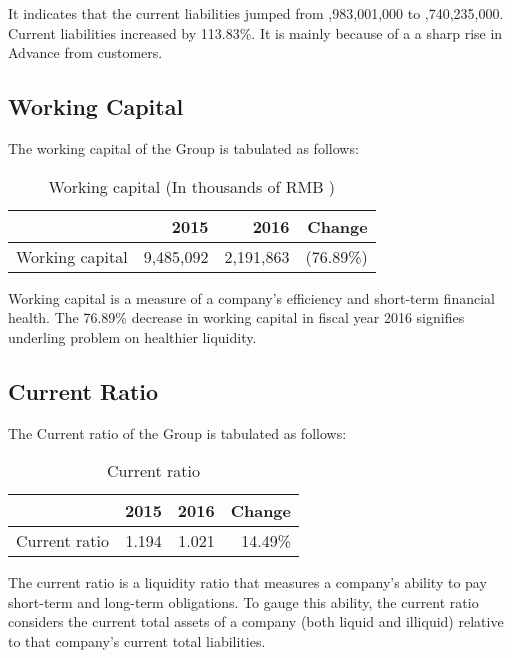 It indicates that the current liabilities jumped from ,983,001,000 to ,740,235,000. Current liabilities increased by 113.83\%. It is mainly because of a a sharp rise in Advance from customers.
	
\subsection{Working Capital}
The working capital of the Group is tabulated as follows:
\begin{table}[H]	
	\begin{center}
		\begin{tabular}{lrrr}
			\toprule
			&\textbf{2015}&\textbf{2016}&\textbf{Change}\\
			\midrule
			Working capital&9,485,092&2,191,863&(76.89\%)\\
			\bottomrule
		\end{tabular}
	\end{center}
	\caption{Working capital (In thousands of RMB \textyen)}\label{table:1}
\end{table}

Working capital is a measure of a company’s efficiency and short-term financial health. The 76.89\% decrease in working capital in fiscal year 2016 signifies underling problem on healthier liquidity.

\subsection{Current Ratio}
The Current ratio of the Group is tabulated as follows:
\begin{table}[H]	
	\begin{center}
		\begin{tabular}{lrrr}
			\toprule
			&\textbf{2015}&\textbf{2016}&\textbf{Change}\\
			\midrule
			Current ratio&1.194&1.021&14.49\%\\
			\bottomrule
		\end{tabular}
	\end{center}
	\caption{Current ratio}\label{table:1}
\end{table}

The current ratio is a liquidity ratio that measures a company's ability to pay short-term and long-term obligations. To gauge this ability, the current ratio considers the current total assets of a company (both liquid and illiquid) relative to that company’s current total liabilities. 

